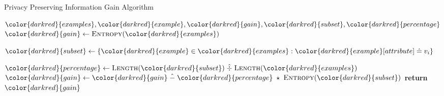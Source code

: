 \begin{algorithm}[H]
\caption{Privacy Preserving Information Gain Algorithm}\label{a:id3-gain-pp}
\begin{algorithmic}[1]
\Require ${\color{darkred}{examples}}, {\color{darkred}{example}}, {\color{darkred}{gain}}, {\color{darkred}{subset}}, {\color{darkred}{percentage}}$
    \State ${\color{darkred}{gain}} \gets \textsc{Entropy}({\color{darkred}{examples}})$

        \State ${\color{darkred}{subset}} \gets \{{\color{darkred}{example}} \in {\color{darkred}{examples}} : {\color{darkred}{example}}[attribute] \heq v_i\}$

        \State ${\color{darkred}{percentage}} \gets \textsc{Length}({\color{darkred}{subset}}) \hdiv \textsc{Length}({\color{darkred}{examples}})$
        \State ${\color{darkred}{gain}} \gets {\color{darkred}{gain}} \hminus {\color{darkred}{percentage}} \hmul \textsc{Entropy}({\color{darkred}{subset}})$
    \EndFor
    \State \textbf{return} ${\color{darkred}{gain}}$
\EndProcedure
\end{algorithmic}
\end{algorithm}
